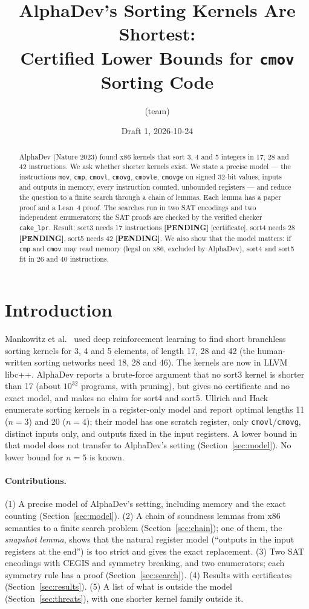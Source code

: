 \documentclass[11pt]{article}
\title{AlphaDev's Sorting Kernels Are Shortest:\\ Certified Lower Bounds for \texttt{cmov} Sorting Code}
\author{(team) }
\date{Draft 1, 2026-10-24}
\theoremstyle{remark}\newtheorem{remark}[theorem]{Remark}
\newcommand{\pending}{\textbf{[PENDING]}}
\begin{document}
\maketitle

\begin{abstract}
AlphaDev (Nature 2023) found x86 kernels that sort 3, 4 and 5 integers in 17, 28 and 42 instructions. We ask whether
shorter kernels exist. We state a precise model --- the instructions \texttt{mov}, \texttt{cmp}, \texttt{cmovl},
\texttt{cmovg}, \texttt{cmovle}, \texttt{cmovge} on signed 32-bit values, inputs and outputs in memory, every instruction
counted, unbounded registers --- and reduce the question to a finite search through a chain of lemmas. Each lemma has a
paper proof and a Lean~4 proof. The searches run in two SAT encodings and two independent enumerators; the SAT proofs are
checked by the verified checker \texttt{cake\_lpr}. Result: sort3 needs 17 instructions \pending{} [certificate],
sort4 needs 28 \pending, sort5 needs 42 \pending. We also show that the model matters: if \texttt{cmp} and \texttt{cmov} may
read memory (legal on x86, excluded by AlphaDev), sort4 and sort5 fit in 26 and 40 instructions.
\end{abstract}

\section{Introduction}
Mankowitz et al.~\cite{alphadev} used deep reinforcement learning to find short branchless sorting kernels for 3, 4 and 5
elements, of length 17, 28 and 42 (the human-written sorting networks need 18, 28 and 46). The kernels are now in LLVM libc++.
AlphaDev reports a brute-force argument that no sort3 kernel is shorter than 17 (about $10^{32}$ programs, with pruning), but
gives no certificate and no exact model, and makes no claim for sort4 and sort5. Ullrich and Hack~\cite{ullrich} enumerate
sorting kernels in a register-only model and report optimal lengths 11 ($n=3$) and 20 ($n=4$); their model has one scratch
register, only \texttt{cmovl}/\texttt{cmovg}, distinct inputs only, and outputs fixed in the input registers. A lower bound in
that model does not transfer to AlphaDev's setting (Section~\ref{sec:model}). No lower bound for $n=5$ is known.

\paragraph{Contributions.}
(1) A precise model of AlphaDev's setting, including memory and the exact counting (Section~\ref{sec:model}).
(2) A chain of soundness lemmas from x86 semantics to a finite search problem (Section~\ref{sec:chain}); one of them, the
\emph{snapshot lemma}, shows that the natural register model (``outputs in the input registers at the end'') is too strict
and gives the exact replacement.
(3) Two SAT encodings with CEGIS and symmetry breaking, and two enumerators; each symmetry rule has a proof
(Section~\ref{sec:search}).
(4) Results with certificates (Section~\ref{sec:results}).
(5) A list of what is outside the model (Section~\ref{sec:threats}), with one shorter kernel family outside it.
\end{document}

